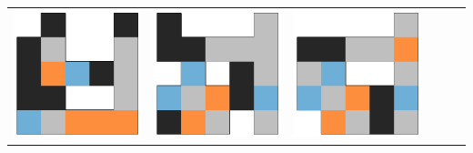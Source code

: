 \begin{tabular}{cccccc}
    \includegraphics[scale=0.1]{images/top_designs/carrier/ga/exp1/gen29_ind3} &
    \includegraphics[scale=0.1]{images/top_designs/carrier/ga/exp1/gen29_ind4} &
    \includegraphics[scale=0.1]{images/top_designs/carrier/ga/exp1/gen29_ind5} \\

\end{tabular}
